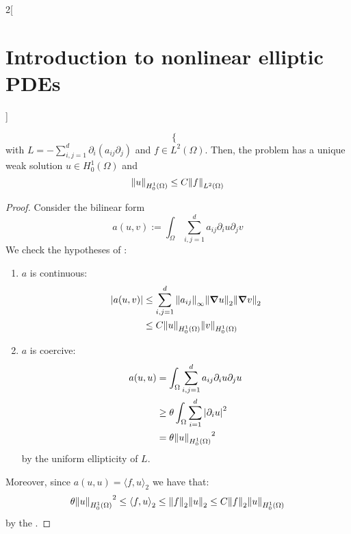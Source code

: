 \documentclass[../../../main_math.tex]{subfiles}
\begin{document}
\begin{multicols}{2}[\section{Introduction to nonlinear elliptic PDEs}]
\begin{proposition}
$$\begin{cases}
      \end{cases}
    $$
    with $L=-\sum_{i,j=1}^d\partial_i(a_{ij}\partial_j)$ and $f\in L^2(\Omega)$. Then, the problem has a unique weak solution $u\in H_0^1(\Omega)$ and
    $$
      \norm{u}_{H_0^1(\Omega)}\leq C\norm{f}_{L^2(\Omega)}
    $$
  \end{proposition}
  \begin{proof}
    Consider the bilinear form $$
      a(u,v):=\int_\Omega\sum_{i,j=1}^da_{ij}\partial_iu\partial_jv
    $$
    We check the hypotheses of :
    \begin{enumerate}
      \item $a$ is continuous:
            \begin{align*}
              \abs{a(u,v)} & \leq \sum_{i,j=1}^d\norm{a_{ij}}_{\infty}\norm{\grad u}_{2}\norm{\grad v}_{2} \\
                           & \leq C\norm{u}_{H_0^1(\Omega)}\norm{v}_{H_0^1(\Omega)}
            \end{align*}
      \item $a$ is coercive:
            \begin{align*}
              a(u,u) & =\int_\Omega\sum_{i,j=1}^da_{ij}\partial_iu\partial_ju   \\
                     & \geq \theta \int_\Omega\sum_{i=1}^d{\abs{\partial_iu}}^2 \\
                     & =\theta {\norm{u}_{H_0^1(\Omega)}}^2
            \end{align*}
            by the uniform ellipticity of $L$.
    \end{enumerate}
    Moreover, since $ a(u,u)={\langle f,u\rangle}_2$ we have that:
    \begin{align*}
      \theta {\norm{u}_{H_0^1(\Omega)}}^2\leq {\langle f,u\rangle}_2\leq \norm{f}_2\norm{u}_{2}\leq C \norm{f}_2\norm{u}_{H_0^1(\Omega)}
    \end{align*}
    by the .
  \end{proof}

\end{multicols}
\end{document}
